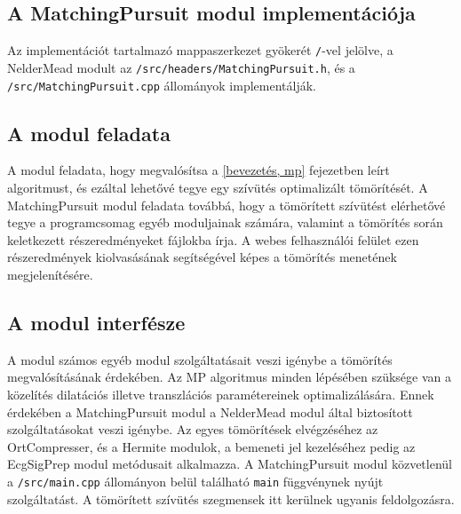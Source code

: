 \documentclass[oneside,titlepage,12pt,a4paper]{report}
\begin{document}

\subsection{A MatchingPursuit modul implementációja}

Az implementációt tartalmazó mappaszerkezet gyökerét \texttt{/}-vel jelölve, a NelderMead modult  az \texttt{/src/headers/MatchingPursuit.h}, és a \texttt{/src/MatchingPursuit.cpp} állományok implementálják.

\subsection*{A modul feladata}

\par A modul feladata, hogy megvalósítsa a \ref{bevezetés, mp} fejezetben leírt algoritmust, és ezáltal lehetővé tegye egy szívütés optimalizált tömörítését. A MatchingPursuit modul feladata továbbá, hogy a tömörített szívütést elérhetővé tegye a programcsomag egyéb moduljainak számára, valamint a tömörítés során keletkezett részeredményeket fájlokba írja. A webes felhasználói felület ezen részeredmények kiolvasásának segítségével képes a tömörítés menetének megjelenítésére. 

\subsection*{A modul interfésze}

\par A modul számos egyéb modul szolgáltatásait veszi igénybe a tömörítés megvalósításának érdekében. Az MP algoritmus minden lépésében szüksége van a közelítés dilatációs illetve transzlációs paramétereinek optimalizálására. Ennek érdekében a MatchingPursuit modul a NelderMead modul által biztosított szolgáltatásokat veszi igénybe. Az egyes tömörítések elvégzéséhez az OrtCompresser, és a Hermite modulok, a bemeneti jel kezeléséhez pedig az EcgSigPrep modul metódusait alkalmazza. A MatchingPursuit modul közvetlenül a \texttt{/src/main.cpp} állományon belül található \texttt{main} függvénynek nyújt szolgáltatást. A tömörített szívütés szegmensek itt kerülnek ugyanis feldolgozásra. 
\end{document}
